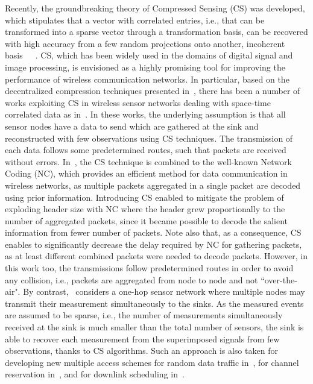 \documentclass[letterpaper,conference]{IEEEtran}
\begin{document}
Recently, the groundbreaking theory of Compressed Sensing (CS) was developed, which stipulates that a vector with correlated entries, i.e., that can be transformed into a sparse vector through a transformation basis, can be recovered with high accuracy from a few random projections onto another, incoherent basis~\cite{Can06feb}~\cite{Don06apr}~\cite{Can06dec}. CS, which has been widely used in the domains of digital signal and image processing, is envisioned as a highly promising tool for improving the performance of wireless communication networks.
In particular, based on the decentralized compression techniques presented in~\cite{Hau08mar}, there has been a number of works exploiting CS in wireless sensor networks dealing with space-time correlated data as in~\cite{Que09feb}\cite{Wan10oct}. In these works, the underlying assumption is that all sensor nodes have a data to send which are gathered at the sink and reconstructed with few observations using CS techniques. The transmission of each data follows some predetermined routes, such that packets are received without errors. In~\cite{Ngu10oct}, the CS technique is combined to the well-known Network Coding (NC), which provides an efficient method for data communication in wireless networks, as multiple packets aggregated in a single packet are decoded using prior information. Introducing CS enabled to mitigate the problem of exploding header size with NC where the header grew proportionally to the number of aggregated packets, since it became possible to decode the salient information from fewer number of packets. Note also that, as a consequence, CS enables to significantly decrease the delay required by NC for gathering packets, as at least  different combined packets were needed to decode  packets. However, in this work too, the transmissions follow predetermined routes in order to avoid any collision, i.e., packets are aggregated from node to node and not
``over-the-air".
By contrast,~\cite{Men09mar} considers a one-hop sensor network where multiple nodes may transmit their measurement simultaneously to the sinks. As the measured events are assumed to be sparse, i.e., the number of measurements simultaneously received at the sink is much smaller than the total number of sensors, the sink is able to recover each measurement from the superimposed signals from few observations, thanks to CS algorithms.
Such an approach is also taken for developing new multiple access schemes for random data traffic in~\cite{Mao10apr}, for channel reservation in~\cite{Qas09sep}, and for downlink scheduling in~\cite{Bha09jun}.
\end{document}
